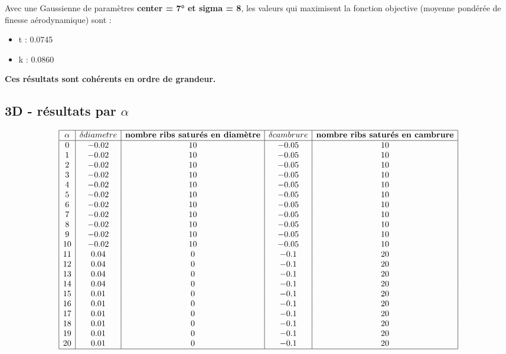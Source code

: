 \documentclass[conference]{IEEEtran}
\begin{document}
    Avec une Gaussienne de paramètres \textbf{center = 7° et sigma = 8}, les valeurs qui maximisent la fonction objective (moyenne pondérée de finesse aérodynamique) sont :
    \begin{itemize}
        \item t : 0.0745
        \item k : 0.0860
    \end{itemize}
    \textbf{Ces résultats sont cohérents en ordre de grandeur.}

\subsection{3D - résultats par $\alpha$}

\[
\begin{array}{|c|c|c|c|c|}
    \hline
    \textbf{$\alpha$} & \textbf{$\delta diametre$} & \textbf{nombre ribs saturés en diamètre} & \textbf{$\delta cambrure$} & \textbf{nombre ribs saturés en cambrure}\\
    \hline
    0 & -0.02 & 10 & -0.05 & 10\\
    1 & -0.02 & 10 & -0.05 & 10\\
    2 & -0.02 & 10 & -0.05 & 10\\
    3 & -0.02 & 10 & -0.05 & 10 \\
    4 & -0.02 & 10 & -0.05 & 10 \\
    5 & -0.02 & 10 & -0.05 & 10 \\
    6 & -0.02 & 10 & -0.05 & 10  \\
    7 & -0.02 & 10 & -0.05 & 10 \\
    8 & -0.02 & 10 & -0.05 & 10 \\
    9 & -0.02 & 10 & -0.05 & 10 \\
    10 & -0.02 & 10 & -0.05 & 10 \\
    11 & 0.04 & 0 & -0.1 & 20 \\
    12 & 0.04 & 0 & -0.1 & 20 \\
    13 & 0.04 & 0 & -0.1 & 20 \\
    14 & 0.04 & 0 & -0.1 & 20 \\
    15 & 0.01 & 0 & -0.1 & 20 \\
    16 & 0.01 & 0 & -0.1 & 20 \\
    17 & 0.01 & 0 & -0.1 & 20 \\
    18 & 0.01 & 0 & -0.1 & 20 \\
    19 & 0.01 & 0 & -0.1 & 20 \\
    20 & 0.01 & 0 & -0.1 & 20 \\
    \hline
\end{array}
\]
\end{document}
